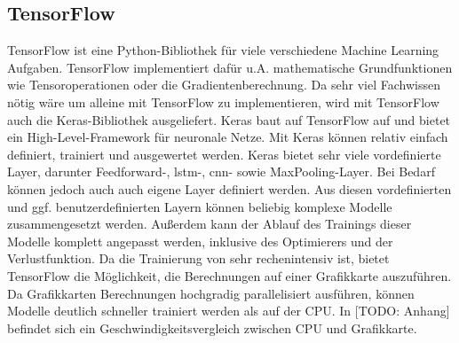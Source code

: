 \subsection{TensorFlow}
\label{sec:TensorFlow}

TensorFlow ist eine Python-Bibliothek für viele verschiedene Machine Learning Aufgaben.
TensorFlow implementiert dafür u.A. mathematische Grundfunktionen wie Tensoroperationen oder die Gradientenberechnung.
Da sehr viel Fachwissen nötig wäre um alleine mit TensorFlow  zu implementieren, wird mit TensorFlow auch die Keras-Bibliothek ausgeliefert.
Keras baut auf TensorFlow auf und bietet ein High-Level-Framework für neuronale Netze.
Mit Keras können  relativ einfach definiert, trainiert und ausgewertet werden.
Keras bietet sehr viele vordefinierte Layer, darunter Feedforward-, \acrshort{lstm}-, \acrshort{cnn}- sowie MaxPooling-Layer.
Bei Bedarf können jedoch auch auch eigene Layer definiert werden.
Aus diesen vordefinierten und ggf. benutzerdefinierten Layern können beliebig komplexe Modelle zusammengesetzt werden.
Außerdem kann der Ablauf des Trainings dieser Modelle komplett angepasst werden, inklusive des Optimierers und der Verlustfunktion.
Da die Trainierung von  sehr rechenintensiv ist, bietet TensorFlow die Möglichkeit, die Berechnungen auf einer Grafikkarte auszuführen.
Da Grafikkarten Berechnungen hochgradig parallelisiert ausführen, können Modelle deutlich schneller trainiert werden als auf der CPU.
In [TODO: Anhang] befindet sich ein Geschwindigkeitsvergleich zwischen CPU und Grafikkarte.
